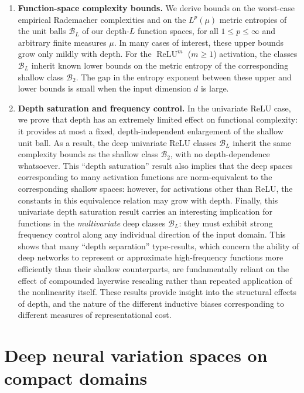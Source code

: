 \documentclass{article}
\DeclareMathOperator{\ReLU}{\mathrm{ReLU}}
\def\cB{{\mathcal{B}}}
\begin{document}
\begin{enumerate}
    \item \textbf{Function-space complexity bounds.}
    We derive bounds on the worst-case empirical Rademacher complexities and on the $L^p(\mu)$ metric entropies of the unit balls $\cB_L$ of our depth-$L$ function spaces, for all $1 \leq p \leq \infty$ and arbitrary finite measures $\mu$. In many cases of interest, these upper bounds grow only mildly with depth. For the $\ReLU^m$ ($m \geq 1$) activation, the classes $\cB_L$ inherit known lower bounds on the metric entropy of the corresponding shallow class $\cB_2$. The gap in the entropy exponent between these upper and lower bounds is small when the input dimension $d$ is large.

    \item \textbf{Depth saturation and frequency control.}
    In the univariate ReLU case, we prove that depth has an extremely limited effect on functional complexity: it provides at most a fixed, depth-independent enlargement of the shallow unit ball. As a result, the deep univariate ReLU classes $\cB_L$ inherit the same complexity bounds as the shallow class $\cB_2$, with no depth-dependence whatsoever. This ``depth saturation'' result also implies that the deep spaces corresponding to many activation functions are norm-equivalent to the corresponding shallow spaces: however, for activations other than ReLU, the constants in this equivalence relation may grow with depth. Finally, this univariate depth saturation result carries an interesting implication for functions in the \textit{multivariate} deep classes $\cB_L$: they must exhibit strong frequency control along any individual direction of the input domain. This shows that many ``depth separation'' type-results, which concern the ability of deep networks to represent or approximate high-frequency functions more efficiently than their shallow counterparts, are fundamentally reliant on the effect of compounded layerwise rescaling rather than repeated application of the nonlinearity itself. These results provide insight into the structural effects of depth, and the nature of the different inductive biases corresponding to different measures of representational cost.
\end{enumerate}


\section{Deep neural variation spaces on compact domains}
\end{document}
